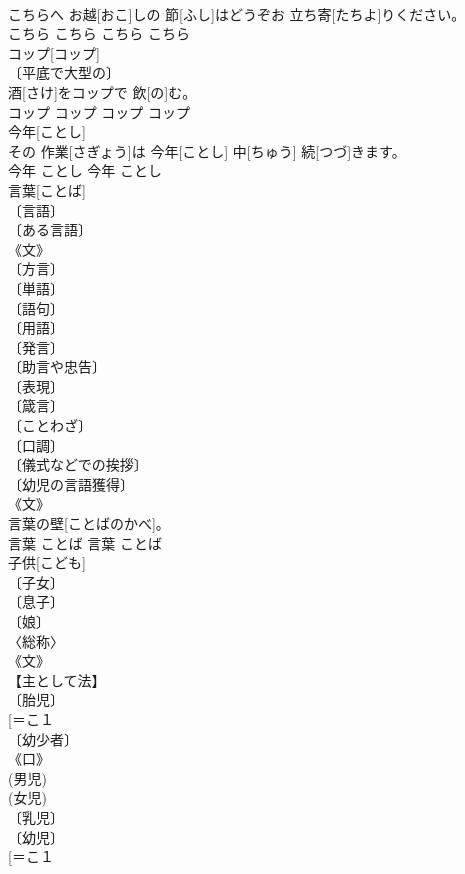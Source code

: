 \documentclass[8pt]{extreport}
\begin{document}
\begin{CJK}{UTF8}{min}
\\	こちらへ お越[おこ]しの 節[ふし]はどうぞお 立ち寄[たちよ]りください。	
\\	こちら	こちら	こちら	こちら	
\\	コップ[コップ]	
\\	〔平底で大型の〕 
\\	酒[さけ]をコップで 飲[の]む。	
\\	コップ	コップ	コップ	コップ	
\\	今年[ことし]	
\\	その 作業[さぎょう]は 今年[ことし] 中[ちゅう] 続[つづ]きます。	
\\	今年	ことし	今年	ことし	
\\	言葉[ことば]	
\\	〔言語〕 
\\	〔ある言語〕 
\\	《文》 
\\	〔方言〕 
\\	〔単語〕 
\\	〔語句〕 
\\	〔用語〕 
\\	〔発言〕 
\\	〔助言や忠告〕 
\\	〔表現〕 
\\	〔箴言〕 
\\	〔ことわざ〕 
\\	〔口調〕 
\\	〔儀式などでの挨拶〕 
\\	〔幼児の言語獲得〕 
\\	《文》 
\\	言葉の壁[ことばのかべ]。	
\\	言葉	ことば	言葉	ことば	
\\	子供[こども]	
\\	〔子女〕 
\\	〔息子〕 
\\	〔娘〕 
\\	〈総称〉 
\\	《文》 
\\	【主として法】 
\\	〔胎児〕 
\\	[＝こ１ 
\\	〔幼少者〕 
\\	《口》 
\\	(男児) 
\\	(女児) 
\\	〔乳児〕 
\\	〔幼児〕 
\\	[＝こ１ 

\end{CJK}
\end{document}

